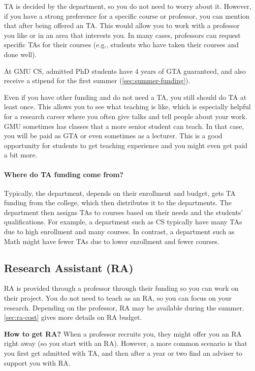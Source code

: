 \documentclass[oneside,11pt]{book}
\newenvironment{commentbox}[1][]{
  \small
  \begin{marker}[\faChessPawn{}]
    {\textbf{#1}}
  }{
  \end{marker}
}
\begin{document}
TA is decided by the department, so you do not need to worry about it.  However, if you have a strong preference for a specific course or professor, you can mention that after being offered an TA. This would allow you to work with a professor you like or in an area that interests you.  In many cases, professors can request specific TAs for their courses (e.g., students who have taken their courses and done well).  



\begin{commentbox}
  At GMU CS, admitted PhD students have 4 years of GTA guaranteed, and also receive a stipend for the first summer (\autoref{sec:summer-funding}).
\end{commentbox}

Even if you have other funding and do not need a TA, you still should do TA at least once.  This allows you to see what teaching is like, which is especially helpful for a research career where you often give talks and tell people about your work. GMU sometimes has classes that a more senior student can teach.  In that case, you will be paid as GTA or even sometimes as a lecturer.  This is a good opportunity for students to get teaching experience and you might even get paid a bit more.

\paragraph{Where do TA funding come from?}  Typically, the department, depends on their enrollment and budget, gets TA funding from the college, which then distributes it to the departments.  The department then assigns TAs to courses based on their needs and the students' qualifications. For example, a department such as CS typically have many TAs due to high enrollment and many courses.  In contrast, a department such as Math might have fewer TAs due to lower enrollment and fewer courses. 

\subsection{Research Assistant (RA)}\label{sec:ra}
RA is provided through a professor through their funding so you can work on their project.
You do not need to teach as an RA, so you can focus on your research. Depending on the professor, RA may be available during the summer. \autoref{sec:ra-cost} gives more details on RA budget.

\textbf{How to get RA?} When a professor recruits you, they might offer you an RA right away (so you start with an RA).  However, a more common scenario is that you first get admitted with TA, and then after a year or two find an adviser to support you with RA.
\end{document}
